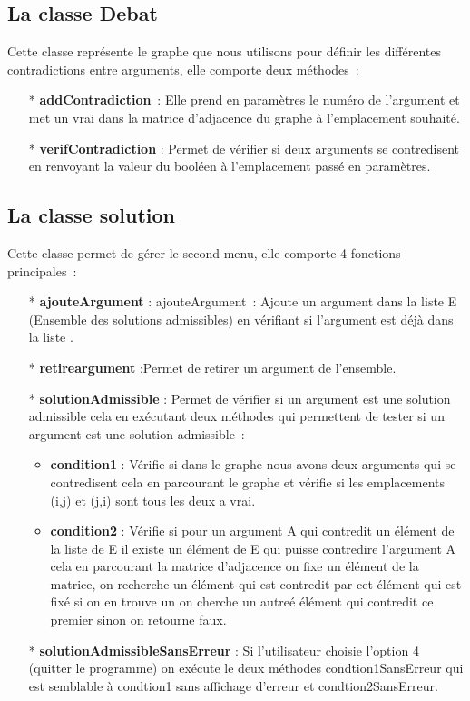 \documentclass[12pt]{article}
\theoremstyle{definition}
\begin{document}
	\subsection{La classe Debat}
	Cette classe représente le graphe que nous utilisons pour définir les différentes contradictions entre arguments, elle comporte deux méthodes :
	\begin{itemize}
		\item [*] \textbf{addContradiction} : Elle prend en paramètres le numéro de l’argument et met un vrai
		dans la matrice d’adjacence du graphe à l’emplacement souhaité.
		\item [*] \textbf{verifContradiction} : Permet de vérifier si deux arguments se contredisent en renvoyant la valeur du booléen à l’emplacement passé en paramètres.
	\end{itemize}
	\subsection{La classe solution}
	Cette classe permet de gérer le second menu, elle comporte 4 fonctions
	principales :
	\begin{itemize}
		\item [*] \textbf{ajouteArgument} : ajouteArgument : Ajoute un argument dans la liste E (Ensemble des solutions admissibles) en vérifiant si l’argument est déjà dans la liste .
		\item [*] \textbf{retireargument} :Permet de retirer un argument de l’ensemble.
		\item [*] \textbf{solutionAdmissible} : Permet de vérifier si un argument est une solution admissible
		cela en exécutant deux méthodes qui permettent de tester si un argument est une
		solution admissible : 
		\begin{itemize}
			\item \textbf{condition1} : Vérifie si dans le graphe nous avons deux arguments qui se contredisent cela en parcourant le graphe et vérifie si les emplacements (i,j) et (j,i) sont tous les deux a vrai.
			\item \textbf{condition2} : Vérifie si pour un argument A qui contredit un élément de la liste de E il existe un élément de E qui puisse contredire l’argument A cela en parcourant la matrice d’adjacence on fixe un élément de la matrice, on
			recherche un élément qui est contredit par cet élément qui est fixé si on en trouve un on cherche un autreé élément qui contredit ce premier sinon on retourne faux.
		\end{itemize}
	\item [*] \textbf{solutionAdmissibleSansErreur} : Si l’utilisateur choisie l’option 4 (quitter le programme) on exécute le deux méthodes condtion1SansErreur qui est semblable à condtion1 sans affichage d’erreur et condtion2SansErreur.
	\end{itemize}
\end{document}
